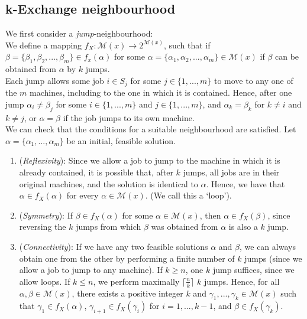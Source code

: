 \documentclass[12pt,a4paper,leqno]{article}
\begin{document}
\subsection*{k-Exchange neighbourhood}

We first consider a \textit{jump}-neighbourhood: \\

We define a mapping $f_X: \mathcal{M}(x) \rightarrow 2^{\mathcal{M}(x)}$, such that if $\beta = \{\beta_1,\beta_2,...,\beta_m \} \in f_x(\alpha)$ for some $\alpha = \{\alpha_1,\alpha_2,...,\alpha_m \} \in \mathcal{M}(x)$ if $\beta$ can be obtained from $\alpha$ by $k$ jumps. \\

Each jump allows some job $i \in S_j$ for some $j \in \{1,...,m\}$ to move to any one of the $m$ machines, including to the one in which it is contained. Hence, after one jump $\alpha_i \neq \beta_j$ for some $i \in \{1,...,m\}$ and $j \in \{1,...,m\}$, and $\alpha_k = \beta_k$ for $k \neq i$ and $k \neq j$, or $\alpha = \beta$ if the job jumps to its own machine. \\

We can check that the conditions for a suitable neighbourhood are satisfied. Let $\alpha = \{\alpha_1,...,\alpha_m\}$ be an initial, feasible solution.
\begin{enumerate}

\item (\textit{Reflexivity}): Since we allow a job to jump to the machine in which it is already contained, it is possible that, after $k$ jumps, all jobs are in their original machines, and the solution is identical to $\alpha$. Hence, we have that $\alpha \in f_X(\alpha)$ for every $\alpha \in \mathcal{M}(x)$. (We call this a `loop').

\item (\textit{Symmetry}): If $\beta \in f_X(\alpha)$ for some $\alpha \in \mathcal{M}(x)$, then $\alpha \in f_X(\beta)$, since reversing the $k$ jumps from which $\beta$ was obtained from $\alpha$ is also a $k$ jump. 

\item (\textit{Connectivity}): If we have any two feasible solutions $\alpha$ and $\beta$, we can always obtain one from the other by performing a finite number of $k$ jumps (since we allow a job to jump to any machine). If $k \geq n$, one $k$ jump suffices, since we allow loops. If $k \leq n$, we perform maximally $\lceil \frac{n}{k} \rceil$ $k$ jumps. Hence, for all $\alpha, \beta \in \mathcal{M}(x)$, there exists a positive integer $k$ and $\gamma_1,...,\gamma_k \in \mathcal{M}(x)$ such that $\gamma_1 \in f_X(\alpha)$, $\gamma_{i+1} \in f_X(\gamma_i)$ for $i=1,...,k-1$, and $\beta \in f_X(\gamma_k)$. 

\end{enumerate}
\end{document}
